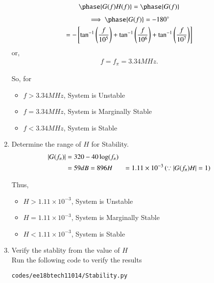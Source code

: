 \begin{enumerate}[label=\thesection.\arabic*.,ref=\thesection.\theenumi]
\begin{align}
\phase{G(f)H(f)} = \phase{G(f)}
\end{align}
\begin{multline}
\implies \phase{G(f)} = -180\degree
\\
=-\sbrak{\tan ^{-1}\brak{\frac{f}{10^{5}}}+\tan ^{-1}\brak{\frac{f}{10^{6}}}+\tan ^{-1}\brak{\frac{f}{10^{7}}}}
\end{multline}
or,
\begin{align}
f = f_{\pi} = 3.34 M Hz.
\end{align}

So, for 
\begin{itemize}
\item $f > 3.34 M Hz$, System is Unstable
\item $f = 3.34 M Hz$, System is Marginally Stable
\item $f < 3.34 M Hz$, System is Stable
\end{itemize}
\item Determine the range of $H$ for Stability.\\
\solution
\begin{align}
\left\vert G(f_{\pi})\right\vert &= 320 - 40\log(f_{\pi})\\
 &= 59 dB = 896
H &= 1.11 \times 10^{-3} \left(\because \left\vert G(f_{\pi})H\right\vert = 1\right)
\end{align}


Thus, 
\begin{itemize}
\item $H > 1.11 \times 10^{-3}$, System is Unstable
\item $H = 1.11 \times 10^{-3}$, System is Marginally Stable
\item $H < 1.11 \times 10^{-3}$, System is Stable
\end{itemize}

\item Verify the stablity from the value of $H$\\
\solution
Run the following code to verify the results
\begin{lstlisting}
codes/ee18btech11014/Stability.py
\end{lstlisting}
\end{enumerate}
